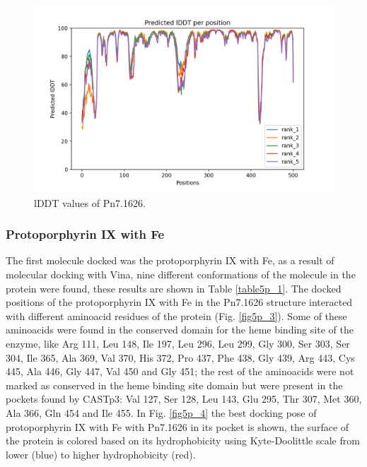 \documentclass[12pt]{article}
\begin{document}
	\FloatBarrier
	\begin{figure}
		\centering
		\includegraphics[width=\textwidth-50pt]{../5/propose/AlphaFold2/test_c0c6c_plddt.png}
		\caption{lDDT values of Pn7.1626.}
		\label{fig5p_2}
	\end{figure}
	\FloatBarrier
	
	
	\subsubsection{Protoporphyrin IX with Fe}
	
	The first molecule docked was the protoporphyrin IX with Fe, as a result of molecular docking with Vina, nine different conformations of the molecule in the protein were found, these results are shown in Table \ref{table5p_1}. The docked positions of the protoporphyrin IX with Fe in the Pn7.1626 structure interacted with different aminoacid residues of the protein (Fig. \ref{fig5p_3}). Some of these aminoacids were found in the conserved domain for the heme binding site of the enzyme, like Arg 111, Leu 148, Ile 197, Leu 296, Leu 299, Gly 300, Ser 303, Ser 304, Ile 365, Ala 369, Val 370, His 372, Pro 437, Phe 438, Gly 439, Arg 443, Cys 445, Ala 446, Gly 447, Val 450 and Gly 451; the rest of the aminoacids were not marked as conserved in the heme binding site domain but were present in the pockets found by CASTp3: Val 127, Ser 128, Leu 143, Glu 295, Thr 307, Met 360, Ala 366, Gln 454 and Ile 455. In Fig. \ref{fig5p_4} the best docking pose of protoporphyrin IX with Fe with Pn7.1626 in its pocket is shown, the surface of the protein is colored based on its hydrophobicity using Kyte-Doolittle scale from lower (blue) to higher hydrophobicity (red).
	
	
	
\end{document}
